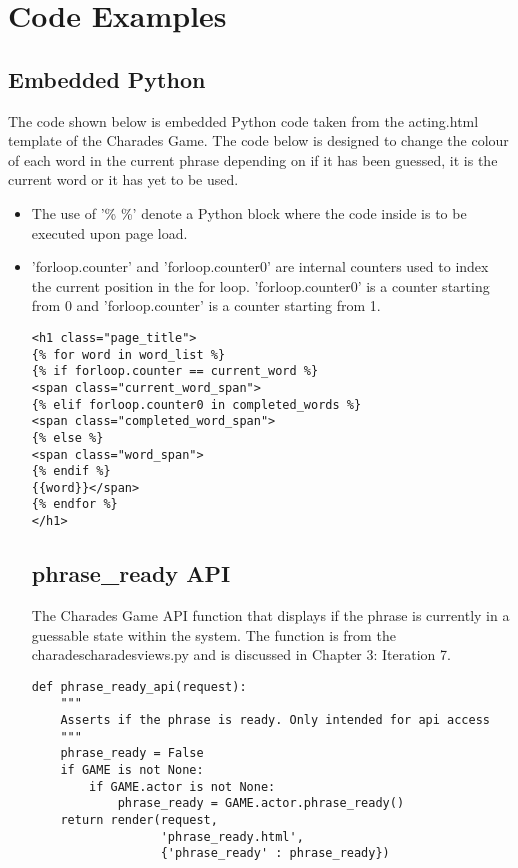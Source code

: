 \chapter{Code Examples}

\section{Embedded Python}

The code shown below is embedded Python code taken from the acting.html template of the Charades Game. The code below is designed to change the colour of each word in the current phrase depending on if it has been guessed, it is the current word or it has yet to be used.

\begin{itemize}
	\item The use of '{\% \%}' denote a Python block where the code inside is to be executed upon page load. 
	
	\item 'forloop.counter' and 'forloop.counter0' are internal counters used to index the current position in the for loop. 'forloop.counter0' is a counter starting from 0 and 'forloop.counter' is a counter starting from 1.

\begin{verbatim}
<h1 class="page_title">
{% for word in word_list %}
{% if forloop.counter == current_word %}
<span class="current_word_span">
{% elif forloop.counter0 in completed_words %}
<span class="completed_word_span">
{% else %}
<span class="word_span">
{% endif %}
{{word}}</span>
{% endfor %}
</h1>
\end{verbatim}

\section{phrase\_ready API}

The Charades Game API function that displays if the phrase is currently in a guessable state within the system. The function is from the charades\/charades\/views.py and is discussed in Chapter 3: Iteration 7.

\begin{verbatim}
def phrase_ready_api(request):
    """
    Asserts if the phrase is ready. Only intended for api access
    """
    phrase_ready = False
    if GAME is not None:
        if GAME.actor is not None:
            phrase_ready = GAME.actor.phrase_ready()
    return render(request,
    		      'phrase_ready.html',
    		      {'phrase_ready' : phrase_ready})
\end{verbatim}



\end{itemize}
